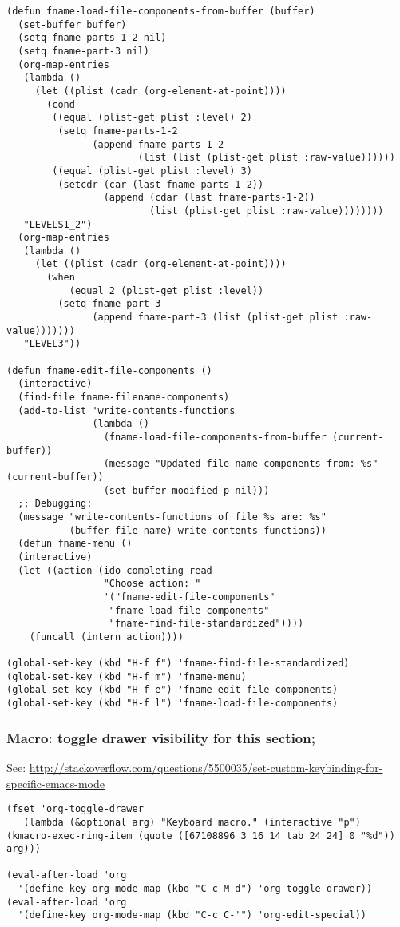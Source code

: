 \documentclass[nofonts]{tufte-handout}
\begin{document}
\begin{verbatim}
(defun fname-load-file-components-from-buffer (buffer)
  (set-buffer buffer)
  (setq fname-parts-1-2 nil)
  (setq fname-part-3 nil)
  (org-map-entries
   (lambda ()
     (let ((plist (cadr (org-element-at-point))))
       (cond
        ((equal (plist-get plist :level) 2)
         (setq fname-parts-1-2
               (append fname-parts-1-2
                       (list (list (plist-get plist :raw-value))))))
        ((equal (plist-get plist :level) 3)
         (setcdr (car (last fname-parts-1-2))
                 (append (cdar (last fname-parts-1-2))
                         (list (plist-get plist :raw-value))))))))
   "LEVELS1_2")
  (org-map-entries
   (lambda ()
     (let ((plist (cadr (org-element-at-point))))
       (when
           (equal 2 (plist-get plist :level))
         (setq fname-part-3
               (append fname-part-3 (list (plist-get plist :raw-value)))))))
   "LEVEL3"))

(defun fname-edit-file-components ()
  (interactive)
  (find-file fname-filename-components)
  (add-to-list 'write-contents-functions
               (lambda ()
                 (fname-load-file-components-from-buffer (current-buffer))
                 (message "Updated file name components from: %s" (current-buffer))
                 (set-buffer-modified-p nil)))
  ;; Debugging:
  (message "write-contents-functions of file %s are: %s"
           (buffer-file-name) write-contents-functions))
  (defun fname-menu ()
  (interactive)
  (let ((action (ido-completing-read
                 "Choose action: "
                 '("fname-edit-file-components"
                  "fname-load-file-components"
                  "fname-find-file-standardized"))))
    (funcall (intern action))))

(global-set-key (kbd "H-f f") 'fname-find-file-standardized)
(global-set-key (kbd "H-f m") 'fname-menu)
(global-set-key (kbd "H-f e") 'fname-edit-file-components)
(global-set-key (kbd "H-f l") 'fname-load-file-components)
\end{verbatim}
\subsubsection{Macro: toggle drawer visibility for this section;}
\label{sec-2-5-19}


See: \url{http://stackoverflow.com/questions/5500035/set-custom-keybinding-for-specific-emacs-mode}

\begin{verbatim}
(fset 'org-toggle-drawer
   (lambda (&optional arg) "Keyboard macro." (interactive "p") (kmacro-exec-ring-item (quote ([67108896 3 16 14 tab 24 24] 0 "%d")) arg)))

(eval-after-load 'org
  '(define-key org-mode-map (kbd "C-c M-d") 'org-toggle-drawer))
(eval-after-load 'org
  '(define-key org-mode-map (kbd "C-c C-'") 'org-edit-special))
\end{verbatim}
\end{document}
